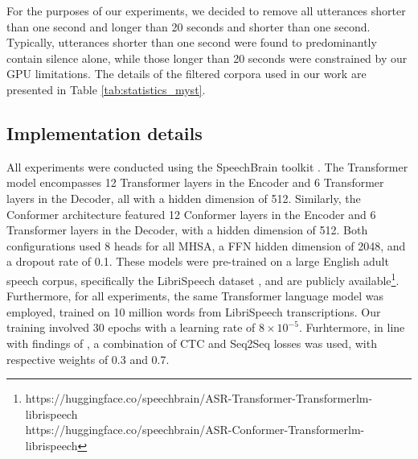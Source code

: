 For the purposes of our experiments, we decided to remove all utterances shorter than one second and longer than 20 seconds and shorter than one second. Typically, utterances shorter than one second were found to predominantly contain silence alone, while those longer than 20 seconds were constrained by our GPU limitations. The details of the filtered corpora used in our work are presented in Table \ref{tab:statistics_myst}. 
\subsection{Implementation details}

All experiments were conducted using the SpeechBrain toolkit \cite{speechbrain}. The Transformer model encompasses 12 Transformer layers in the Encoder and 6 Transformer layers in the Decoder, all with a hidden dimension of 512. Similarly, the Conformer architecture featured 12 Conformer layers in the Encoder and 6 Transformer layers in the Decoder, with a hidden dimension of 512. Both configurations used 8 heads for all \ac{MHSA}, a \ac{FFN} hidden dimension of 2048, and a dropout rate of 0.1. These models were pre-trained on a large English adult speech corpus, specifically the LibriSpeech dataset \cite{librispeech}, and are publicly available\footnote{https://huggingface.co/speechbrain/ASR-Transformer-Transformerlm-librispeech\\ https://huggingface.co/speechbrain/ASR-Conformer-Transformerlm-librispeech}. Furthermore, for all experiments, the same Transformer language model was employed, trained on 10 million words from LibriSpeech transcriptions. Our training involved 30 epochs with a learning rate of $8 \times 10^{-5}$. Furhtermore, in line with findings of \cite{gelin2021endtoend}, a combination of \ac{CTC} and \ac{Seq2Seq} losses was used, with respective weights of 0.3 and 0.7.

